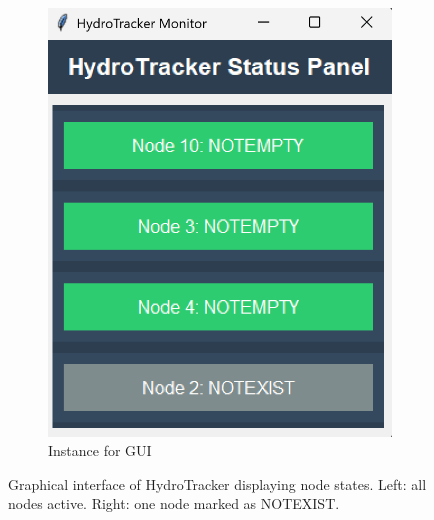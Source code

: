 \begin{figure}[H]
\begin{subfigure}[b]{0.4\linewidth}
        \includegraphics[width=\linewidth]{gui_images/gui_screenshot_2.png}
        \caption{Instance for GUI}
        \label{fig:subfig2}
    \end{subfigure}
\caption{Graphical interface of HydroTracker displaying node states. Left: all nodes active. Right: one node marked as NOTEXIST.}
    \label{fig:combined}
\end{figure}

